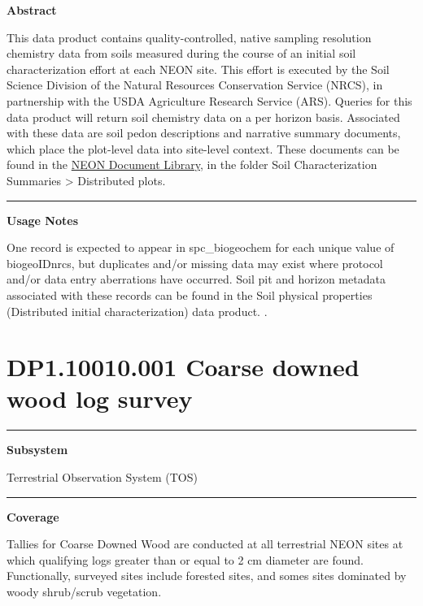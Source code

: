 \documentclass[]{article}
\begin{document}
\textbf{Abstract}

This data product contains quality-controlled, native sampling
resolution chemistry data from soils measured during the course of an
initial soil characterization effort at each NEON site. This effort is
executed by the Soil Science Division of the Natural Resources
Conservation Service (NRCS), in partnership with the USDA Agriculture
Research Service (ARS). Queries for this data product will return soil
chemistry data on a per horizon basis. Associated with these data are
soil pedon descriptions and narrative summary documents, which place the
plot-level data into site-level context. These documents can be found in
the \href{http://data.neonscience.org/documents}{NEON Document Library},
in the folder Soil Characterization Summaries \textgreater{} Distributed
plots.

\begin{center}\rule{0.5\linewidth}{\linethickness}\end{center}

\textbf{Usage Notes}

One record is expected to appear in spc\_biogeochem for each unique
value of biogeoIDnrcs, but duplicates and/or missing data may exist
where protocol and/or data entry aberrations have occurred. Soil pit and
horizon metadata associated with these records can be found in the Soil
physical properties (Distributed initial characterization) data product.
\newpage
.

\section{DP1.10010.001 Coarse downed wood log
survey}\label{dp1.10010.001-coarse-downed-wood-log-survey}

\begin{center}\rule{0.5\linewidth}{\linethickness}\end{center}

\textbf{Subsystem}

Terrestrial Observation System (TOS)

\begin{center}\rule{0.5\linewidth}{\linethickness}\end{center}

\textbf{Coverage}

Tallies for Coarse Downed Wood are conducted at all terrestrial NEON
sites at which qualifying logs greater than or equal to 2 cm diameter
are found. Functionally, surveyed sites include forested sites, and
somes sites dominated by woody shrub/scrub vegetation.
\end{document}
